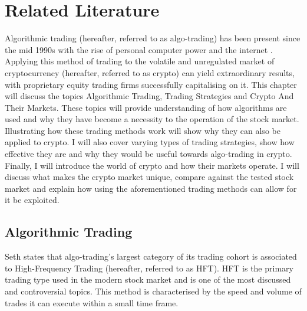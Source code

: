 %
\chapter{Related Literature}
\label{sec:related}
Algorithmic trading (hereafter, referred to as algo-trading) has been present since the mid 1990s with the rise of personal computer power and the internet \cite{WEB:PISANI:2010}. Applying this method of trading to the volatile and unregulated market of cryptocurrency (hereafter, referred to as crypto) can yield extraordinary results, with proprietary equity trading firms successfully capitalising on it. This chapter will discuss the topics Algorithmic Trading, Trading Strategies and Crypto And Their Markets. These topics will provide understanding of how algorithms are used and why they have become a necessity to the operation of the stock market. Illustrating how these trading methods work will show why they can also be applied to crypto. I will also cover varying types of trading strategies, show how effective they are and why they would be useful towards algo-trading in crypto. Finally, I will introduce the world of crypto and how their markets operate. I will discuss what makes the crypto market unique, compare against the tested stock market and explain how using the aforementioned trading methods can allow for it be exploited. 


\section{Algorithmic Trading}
\label{sec:related:algoTrading}
\noindent Seth \cite{WEB:SETH:0001} states that algo-trading's largest category of its trading cohort is associated to High-Frequency Trading (hereafter, referred to as HFT). HFT is the primary trading type used in the modern stock market and is one of the most discussed and controversial topics. This method is characterised by the speed and volume of trades it can execute within a small time frame.

